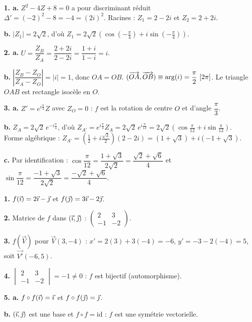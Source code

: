 \documentclass[11pt]{article}
\begin{document}

\textbf{1. a.} $Z^2 - 4Z + 8 = 0$ a pour discriminant réduit $\Delta' = (-2)^2 - 8 = -4 = (2i)^2$. Racines : $Z_1 = 2 - 2i$ et $Z_2 = 2 + 2i$.

\textbf{b.} $|Z_1| = 2\sqrt{2}$, d'où $Z_1 = 2\sqrt{2}\left(\cos\left(-\tfrac{\pi}{4}\right) + i\sin\left(-\tfrac{\pi}{4}\right)\right)$.

\textbf{2. a.} $U = \dfrac{Z_B}{Z_A} = \dfrac{2 + 2i}{2 - 2i} = \dfrac{1+i}{1-i} = i$.

\textbf{b.} $\left|\dfrac{Z_B - Z_O}{Z_A - Z_O}\right| = |i| = 1$, donc $OA = OB$. $(\overrightarrow{OA}, \overrightarrow{OB}) \equiv \arg(i) = \dfrac{\pi}{2}\ [2\pi]$. Le triangle $OAB$ est rectangle isocèle en $O$.

\textbf{3. a.} $Z' = e^{i\frac{\pi}{3}}Z$ avec $Z_O = 0$ : $f$ est la rotation de centre $O$ et d'angle $\dfrac{\pi}{3}$.

\textbf{b.} $Z_A = 2\sqrt{2}\,e^{-i\frac{\pi}{4}}$, d'où $Z_{A'} = e^{i\frac{\pi}{3}}Z_A = 2\sqrt{2}\,e^{i\frac{\pi}{12}} = 2\sqrt{2}\left(\cos\tfrac{\pi}{12} + i\sin\tfrac{\pi}{12}\right)$. Forme algébrique : $Z_{A'} = \left(\tfrac{1}{2} + i\tfrac{\sqrt{3}}{2}\right)(2 - 2i) = (1 + \sqrt{3}) + i(-1 + \sqrt{3})$.

\textbf{c.} Par identification : $\cos\dfrac{\pi}{12} = \dfrac{1 + \sqrt{3}}{2\sqrt{2}} = \dfrac{\sqrt{2} + \sqrt{6}}{4}$ et $\sin\dfrac{\pi}{12} = \dfrac{-1 + \sqrt{3}}{2\sqrt{2}} = \dfrac{-\sqrt{2} + \sqrt{6}}{4}$.

\textbf{1.} $f(\vec{\imath}) = 2\vec{\imath} - \vec{\jmath}$ et $f(\vec{\jmath}) = 3\vec{\imath} - 2\vec{\jmath}$.

\textbf{2.} Matrice de $f$ dans $(\vec{\imath},\vec{\jmath})$ : $\begin{pmatrix} 2 & 3 \\ -1 & -2 \end{pmatrix}$.

\textbf{3.} $f(\vec{V})$ pour $\vec{V}(3, -4)$ : $x' = 2(3) + 3(-4) = -6$, $y' = -3 - 2(-4) = 5$, soit $\vec{V'}(-6, 5)$.

\textbf{4.} $\begin{vmatrix} 2 & 3 \\ -1 & -2 \end{vmatrix} = -1 \ne 0$ : $f$ est bijectif (automorphisme).

\textbf{5. a.} $f\circ f(\vec{\imath}) = \vec{\imath}$ et $f\circ f(\vec{\jmath}) = \vec{\jmath}$.

\textbf{b.} $(\vec{\imath},\vec{\jmath})$ est une base et $f\circ f = \mathrm{id}$ : $f$ est une symétrie vectorielle.
\end{document}
